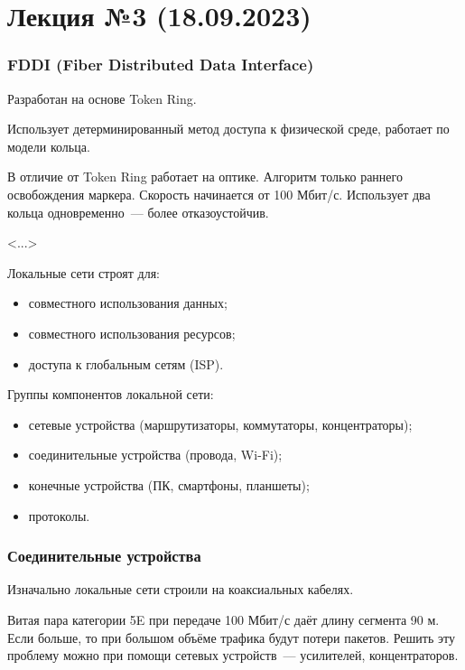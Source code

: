 \section{Лекция №3 (18.09.2023)}

\subsubsection{FDDI (Fiber Distributed Data Interface)}

Разработан на основе Token Ring.

Использует детерминированный метод доступа к физической среде, работает по модели кольца.

В отличие от Token Ring работает на оптике. Алгоритм только раннего освобождения маркера. Скорость начинается от 100 Мбит/с. Использует два кольца одновременно~--- более отказоустойчив.

<...>

Локальные сети строят для:

\begin{itemize}
    \item совместного использования данных;
    \item совместного использования ресурсов;
    \item доступа к глобальным сетям (ISP).
\end{itemize}

Группы компонентов локальной сети:

\begin{itemize}
    \item сетевые устройства (маршрутизаторы, коммутаторы, концентраторы);
    \item соединительные устройства (провода, Wi-Fi);
    \item конечные устройства (ПК, смартфоны, планшеты);
    \item протоколы.
\end{itemize}

\subsubsection{Соединительные устройства}

Изначально локальные сети строили на коаксиальных кабелях.

Витая пара категории 5E при передаче 100 Мбит/с даёт длину сегмента 90 м. Если больше, то при большом объёме трафика будут потери пакетов. Решить эту проблему можно при помощи сетевых устройств~--- усилителей, концентраторов.

